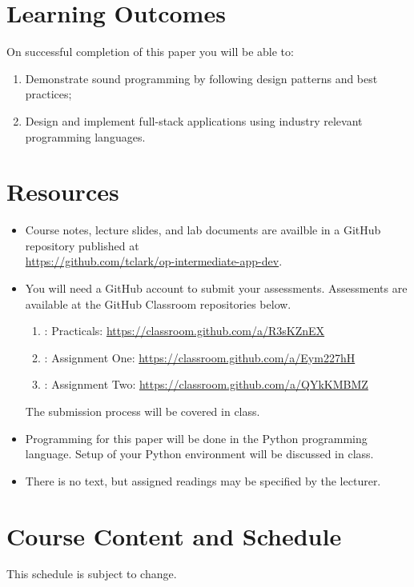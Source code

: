 \documentclass{article}
\begin{document}
\newpage 

\section*{Learning Outcomes}
On successful completion of this paper you will be able to:
\begin{enumerate}
  \item Demonstrate sound programming by following design patterns and best practices;
  \item Design and implement full-stack applications using industry relevant programming languages.
\end{enumerate}

\section*{Resources}
\begin{itemize}
	\item Course notes, lecture slides, and lab documents are availble in a GitHub repository published at \\ \url{https://github.com/tclark/op-intermediate-app-dev}.
	\item You will need a GitHub account to submit your assessments. Assessments are available at the GitHub Classroom repositories below.
	    \begin{enumerate}
	    \item: Practicals: \url{https://classroom.github.com/a/R3sKZnEX}
	    \item: Assignment One: \url{https://classroom.github.com/a/Eym227hH}
	    \item: Assignment Two: \url{https://classroom.github.com/a/QYkKMBMZ}
	  \end{enumerate}
	  The submission process will be covered in class.
	\item Programming for this paper will be done in the Python programming language. Setup of your Python environment will be discussed in class. 
	\item There is no text, but assigned readings may be specified by the lecturer.     
\end{itemize}

\pagebreak

\section*{Course Content and Schedule}
This schedule is subject to change.
\end{document}
